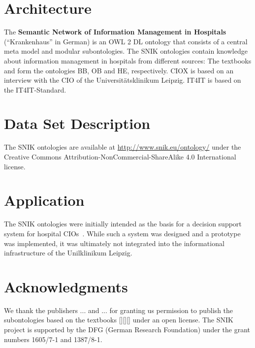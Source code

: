 \documentclass[sw]{iosart2x}
\begin{document}
\section{Architecture}\label{sec:architecture}
The \textbf{Semantic Network of Information Management in Hospitals} (\enquote{Krankenhaus} in German) is an OWL 2 DL ontology that consists of a central meta model and modular subontologies. 
The SNIK ontologies contain knowledge about information management in hospitals from different sources:%
The textbooks \citet{bb} \citet{ob} and \citet{he} form the ontologies BB, OB and HE, respectively. 
CIOX is based on an interview with the CIO of the Universitätsklinikum Leipzig.
IT4IT is based on the IT4IT-Standard.

\section{Data Set Description}\label{sec:dsd}
The SNIK ontologies are available at \url{http://www.snik.eu/ontology/} under the Creative Commons Attribution-NonCommercial-ShareAlike 4.0 International license.

\section{Application}\label{sec:application}
The SNIK ontologies were initially intended as the basis for a decision support system for hospital CIOs~\citep{domaene}.
While such a system was designed and a prototype was implemented, it was ultimately not integrated into the informational infrastructure of the Unilklinikum Leipzig.



\section{Acknowledgments}
We thank the publishers ... and ... for granting us permission to publish the subontologies based on the textbooks [][][] under an open license.
The SNIK project is supported by the DFG (German Research Foundation) under the grant numbers 1605/7-1 and 1387/8-1.
\nocite{*} 


\end{document}
